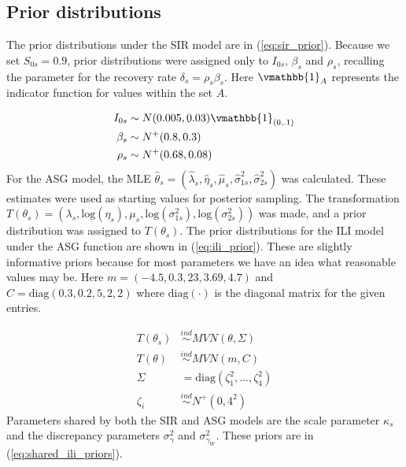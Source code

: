 \documentclass[ba]{imsart}
\theoremstyle{plain}
\theoremstyle{definition}
\theoremstyle{remark}
\begin{document}
\begin{supplement}
\section{Prior distributions}

The prior distributions under the SIR model are in (\ref{eq:sir_prior}). 
Because we set $S_{0s} = 0.9$, prior distributions were assigned only to 
$I_{0s}$, $\beta_s$ and $\rho_s$, recalling the parameter for the recovery 
rate $\delta_s = \rho_s \beta_s$. Here $\vmathbb{1}_{A}$ represents the 
indicator function for values within the set $A$.

\begin{equation}
\begin{aligned}
    \label{eq:sir_prior}
        I_{0s} &\sim N(0.005, 0.03) \vmathbb{1}_{(0, .1)} \\
        \beta_s &\sim N^+(0.8, 0.3) \\
        \rho_s &\sim N^+(0.68, 0.08)
\end{aligned}
\end{equation}
For the ASG model, the MLE 
$\hat{\theta}_s = (\hat{\lambda}_s, \hat{\eta}_s, \hat{\mu}_s, \hat{\sigma}_{1s}^2, \hat{\sigma}_{2s}^2)$ 
was calculated. %
These estimates were used as starting values for posterior sampling. 
The transformation 
$T(\theta_s) = (\lambda_s, \text{log}(\eta_s), \mu_s, \text{log}(\sigma_{1s}^2), \text{log}(\sigma_{2s}^2))$ 
was made, and a prior distribution was assigned to $T(\theta_s)$.
The prior distributions for the ILI model under the ASG function are shown 
in (\ref{eq:ili_prior}). These are slightly informative priors because for 
most parameters we have an idea what reasonable values may be. Here 
$m = (-4.5, 0.3, 23, 3.69, 4.7)$ and $C = \text{diag}(0.3, 0.2, 5, 2, 2)$
where $\text{diag}(\cdot)$ 
is the diagonal matrix for the given entries.


\begin{equation}
\begin{aligned}
\label{eq:ili_prior}
                T(\theta_s) &\overset{ind}{\sim} MVN(\theta, \Sigma) \\
                T(\theta) &\overset{ind}{\sim} MVN(m, C)\\
                \Sigma &= \text{diag}(\zeta^2_1,...,\zeta^2_4) \\
                \zeta_i &\overset{ind}{\sim} N^+(0,4^2)
\end{aligned}
\end{equation}
Parameters shared by both the SIR and ASG models are the scale parameter 
$\kappa_s$ and the discrepancy parameters $\sigma_{\gamma}^2$ and 
$\sigma_{\gamma_W}^2$. These priors are in (\ref{eq:shared_ili_priors}). 


\end{supplement}
\end{document}
